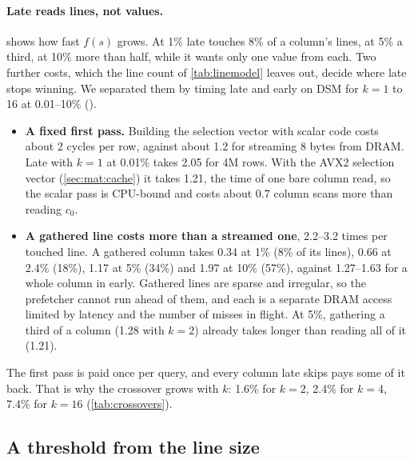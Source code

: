 \paragraph{Late reads lines, not values.}  shows how fast $f(s)$ grows. At
1\% late touches 8\% of a column's lines, at 5\% a third, at 10\% more than half, while it wants
only one value from each. Two further costs, which the line count of \cref{tab:linemodel}
leaves out, decide where late stops winning. We separated them by timing late and early on DSM
for $k = 1$ to 16 at 0.01--10\% ().
\begin{itemize}
\item \textbf{A fixed first pass.} Building the selection vector with scalar code costs about 2
cycles per row, against about 1.2 for streaming 8 bytes from DRAM. Late with $k{=}1$ at
0.01\% takes 2.05\ms{} for 4M rows. With the AVX2 selection vector (\cref{sec:mat:cache}) it
takes 1.21\ms, the time of one bare column read, so the scalar pass is CPU-bound and costs
about 0.7 column scans more than reading $c_0$.
\item \textbf{A gathered line costs more than a streamed one}, 2.2--3.2 times per touched line.
A gathered column takes 0.34\ms{} at 1\% (8\% of its lines), 0.66\ms{} at 2.4\% (18\%),
1.17\ms{} at 5\% (34\%) and 1.97\ms{} at 10\% (57\%), against 1.27--1.63\ms{} for a whole
column in early. Gathered lines are sparse and irregular, so the prefetcher cannot run ahead of
them, and each is a separate DRAM access limited by latency and the number of misses in flight.
At 5\%, gathering a third of a column (1.28\ms{} with $k{=}2$) already takes longer than
reading all of it (1.21\ms).
\end{itemize}
The first pass is paid once per query, and every column late skips pays some of it back. That
is why the crossover grows with $k$: 1.6\% for $k{=}2$, 2.4\% for $k{=}4$, 7.4\% for $k{=}16$
(\cref{tab:crossovers}).

\subsection{A threshold from the line size}
\label{sec:mat:threshold}

